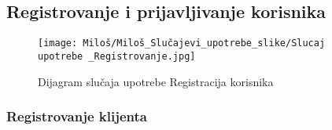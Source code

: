 \documentclass[a4paper]{article}
\begin{document}

\subsection{Registrovanje i prijavljivanje korisnika}

\begin{figure}[htp]
    \centering
    \texttt{[image: Miloš/Miloš\_Slučajevi\_upotrebe\_slike/Slucaj upotrebe \_Registrovanje.jpg]}
    \caption{Dijagram slučaja upotrebe Registracija korisnika}
    \label{fig:Registracija}
\end{figure}

\subsubsection{Registrovanje klijenta}
\end{document}
